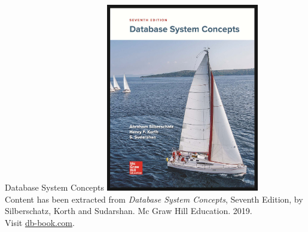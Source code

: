 \documentclass{beamer}
\begin{document}
\begin{frame}{Database System Concepts}
    \centering
    \includegraphics[width=0.5\textwidth]{figures/book_cover.jpg} \\
    \vspace{5mm}
    {
        \tiny
        Content has been extracted from \textit{Database System Concepts}, Seventh Edition, by Silberschatz, Korth and Sudarshan. Mc Graw Hill Education. 2019.\\
        Visit \href{https://db-book.com/}{db-book.com}.\\
    }
\end{frame}
\end{document}
